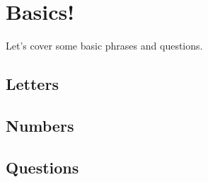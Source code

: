 \chapter{Basics!}

Let's cover some basic phrases and questions.

\section{Letters}

\section{Numbers}

\section{Questions}


